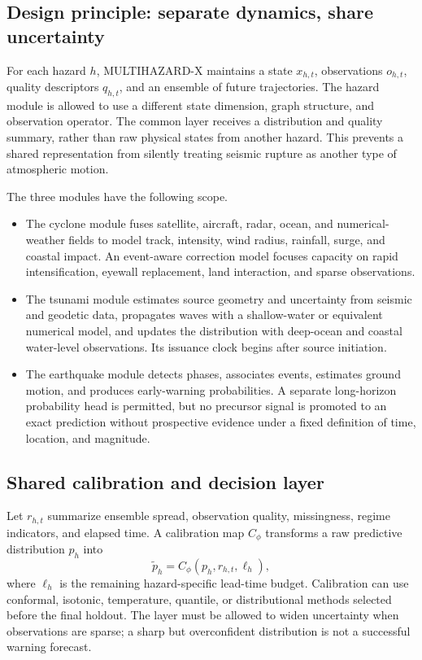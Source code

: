 \documentclass[conference]{IEEEtran}
\begin{document}
\subsection{Design principle: separate dynamics, share uncertainty}

For each hazard $h$, MULTIHAZARD-X maintains a state $x_{h,t}$, observations $o_{h,t}$, quality descriptors $q_{h,t}$, and an ensemble of future trajectories. The hazard module is allowed to use a different state dimension, graph structure, and observation operator. The common layer receives a distribution and quality summary, rather than raw physical states from another hazard. This prevents a shared representation from silently treating seismic rupture as another type of atmospheric motion.

The three modules have the following scope.

\begin{itemize}
\item The cyclone module fuses satellite, aircraft, radar, ocean, and numerical-weather fields to model track, intensity, wind radius, rainfall, surge, and coastal impact. An event-aware correction model focuses capacity on rapid intensification, eyewall replacement, land interaction, and sparse observations.
\item The tsunami module estimates source geometry and uncertainty from seismic and geodetic data, propagates waves with a shallow-water or equivalent numerical model, and updates the distribution with deep-ocean and coastal water-level observations. Its issuance clock begins after source initiation.
\item The earthquake module detects phases, associates events, estimates ground motion, and produces early-warning probabilities. A separate long-horizon probability head is permitted, but no precursor signal is promoted to an exact prediction without prospective evidence under a fixed definition of time, location, and magnitude.
\end{itemize}

\subsection{Shared calibration and decision layer}

Let $r_{h,t}$ summarize ensemble spread, observation quality, missingness, regime indicators, and elapsed time. A calibration map $C_\phi$ transforms a raw predictive distribution $p_h$ into
\begin{equation}
 \widetilde p_h=C_\phi(p_h,r_{h,t},\ell_h),
 \label{eq:calibration}
\end{equation}
where $\ell_h$ is the remaining hazard-specific lead-time budget. Calibration can use conformal, isotonic, temperature, quantile, or distributional methods selected before the final holdout. The layer must be allowed to widen uncertainty when observations are sparse; a sharp but overconfident distribution is not a successful warning forecast.
\end{document}
